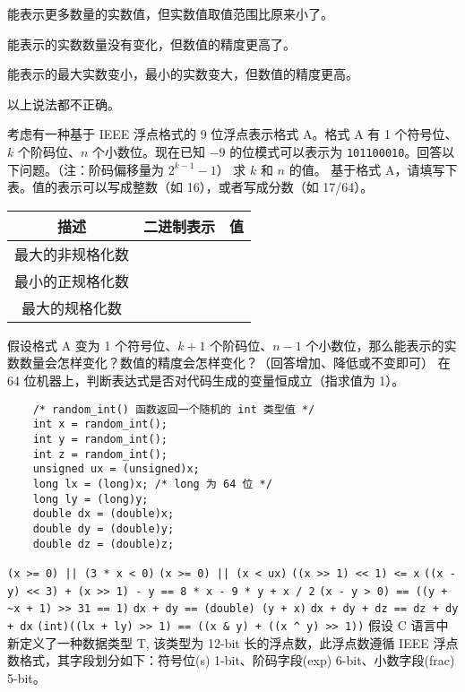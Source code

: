 \begin{problems}
\begin{choices}
			\item 能表示更多数量的实数值，但实数值取值范围比原来小了。
			\item 能表示的实数数量没有变化，但数值的精度更高了。
			\item 能表示的最大实数变小，最小的实数变大，但数值的精度更高。
			\item 以上说法都不正确。
        \end{choices}
		 考虑有一种基于 IEEE 浮点格式的 9 位浮点表示格式 A。格式 A 有 1 个符号位、$k$ 个阶码位、$n$ 个小数位。现在已知 $-9$ 的位模式可以表示为 \texttt{101100010}。回答以下问题。（注：阶码偏移量为 $2^{k-1}-1$）
			\qn 求 $k$ 和 $n$ 的值。
			\qn 基于格式 A，请填写下表。值的表示可以写成整数（如 16），或者写成分数（如 17/64）。
			\begin{table}[H]
				\centering
				\begin{tabular}{|c|c|c|}
					\hline
					描述 & 二进制表示 & 值 \\ \hline
					最大的非规格化数 & {\qquad \qquad} & {\qquad \qquad} \\ \hline
					最小的正规格化数 & {\qquad \qquad} & {\qquad \qquad} \\ \hline
					最大的规格化数 & {\qquad \qquad} & {\qquad \qquad} \\ \hline
				\end{tabular}
			\end{table}
			\qn 假设格式 A 变为 1 个符号位、$k+1$ 个阶码位、$n-1$ 个小数位，那么能表示的实数数量会怎样变化？数值的精度会怎样变化？（回答增加、降低或不变即可）
		 在 64 位机器上，判断表达式是否对代码生成的变量恒成立（指求值为 1）。
		\begin{verbatim}
    /* random_int() 函数返回一个随机的 int 类型值 */
    int x = random_int();
    int y = random_int();
    int z = random_int();
    unsigned ux = (unsigned)x;
    long lx = (long)x; /* long 为 64 位 */
    long ly = (long)y;
    double dx = (double)x;
    double dy = (double)y;
    double dz = (double)z;
		\end{verbatim}
			\qn \verb+(x >= 0) || (3 * x < 0)+
			\qn \verb+(x >= 0) || (x < ux)+
			\qn \verb|((x >> 1) << 1) <= x|
			\qn \verb|((x - y) << 3) + (x >> 1) - y == 8 * x - 9 * y + x / 2|
			\qn \verb|(x - y > 0) == ((y + ~x + 1) >> 31 == 1)|
			\qn \verb|dx + dy == (double) (y + x)|
			\qn \verb|dx + dy + dz == dz + dy + dx|
			\qn \verb|(int)((lx + ly) >> 1) == ((x & y) + ((x ^ y) >> 1))|
		 假设 C 语言中新定义了一种数据类型 T, 该类型为 12-bit 长的浮点数，此浮点数遵循 IEEE 浮点数格式，其字段划分如下：符号位(s) 1-bit、阶码字段(exp) 6-bit、小数字段(frac) 5-bit。

\end{problems}
